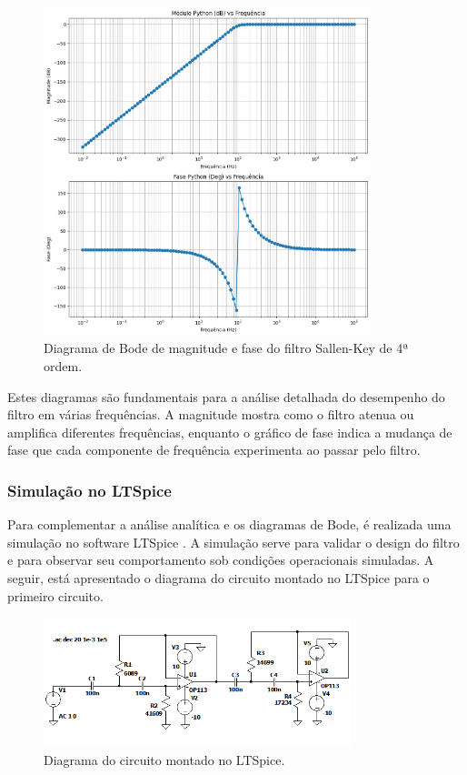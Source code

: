 \documentclass[
	12pt,				%
	openright,			%
	twoside,			%
	a4paper,			%
	english,			%
	french,				%
	spanish,			%
	brazil,				%
	]{abntex2}
\begin{document}
\begin{figure}[H]
    \centering
    \includegraphics[width=0.85\textwidth]{imgs/output.png}
    \caption{Diagrama de Bode de magnitude e fase do filtro Sallen-Key de 4ª ordem.}
    \label{fig:first_circuit_bode_diagrams}
\end{figure}


Estes diagramas são fundamentais para a análise detalhada do desempenho do filtro em várias frequências. A magnitude mostra como o filtro atenua ou amplifica diferentes frequências, enquanto o gráfico de fase indica a mudança de fase que cada componente de frequência experimenta ao passar pelo filtro.

\subsubsection{Simulação no LTSpice}
Para complementar a análise analítica e os diagramas de Bode, é realizada uma simulação no software LTSpice \cite{ltspice}. A simulação serve para validar o design do filtro e para observar seu comportamento sob condições operacionais simuladas. A seguir, está apresentado o diagrama do circuito montado no LTSpice para o primeiro circuito.

\begin{figure}[H]
    \centering
    \includegraphics[width=0.8\textwidth]{imgs/circuito_ltspice.png}
    \caption{Diagrama do circuito montado no LTSpice.}
    \label{fig:first_circuit_ltspice_diagram}
\end{figure}
\end{document}
